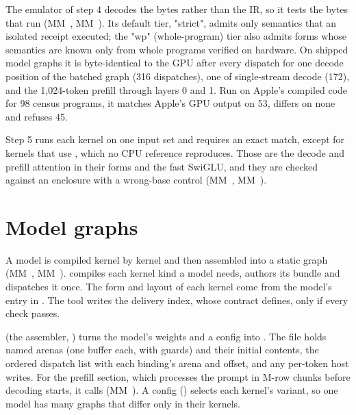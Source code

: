 The emulator of step 4 decodes the bytes rather than the IR, so it tests the bytes that run (MM~,
MM~). Its default tier, "strict", admits only semantics that an isolated
receipt executed; the "wp" (whole-program) tier also admits forms whose semantics are known only from whole programs
verified on hardware. On shipped model graphs it is byte-identical to the GPU after every dispatch for one decode position
of the batched graph (316 dispatches), one of single-stream decode (172), and the 1,024-token prefill through layers 0
and 1. Run on Apple's compiled code for 98 census programs, it matches Apple's GPU output on 53, differs on none and refuses 45.

Step 5 runs each kernel on one input set and requires an exact match, except for kernels that use , which no CPU reference reproduces. Those are
the decode and prefill attention in their  forms and the fast SwiGLU, and they are checked against an
enclosure with a wrong-base control (MM~, MM~).

\section{Model graphs}\label{ch:model-graphs}

A model is compiled kernel by kernel and then assembled into a static graph (MM~, MM~).
 compiles each kernel kind a model needs, authors its bundle and dispatches it once.
The form and layout of each kernel come from the model's entry in . The tool
writes the delivery index, whose contract  defines, only if every check passes.

 (the assembler, ) turns the model's weights
and a config into . The file holds named arenas (one buffer each, with guards) and their initial
contents, the ordered dispatch list with each binding's arena and offset, and any per-token host writes. For the
prefill section, which processes the prompt in M-row chunks before decoding starts, it calls  (MM~).
A config () selects each kernel's variant, so one model has many graphs that differ only in
their kernels.
